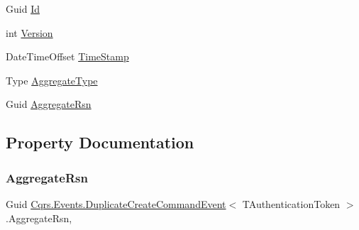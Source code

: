 \begin{DoxyCompactItemize}
\item 
Guid \hyperlink{classCqrs_1_1Events_1_1DuplicateCreateCommandEvent_a6b837c04369ac127fc34f84799c3d70a_a6b837c04369ac127fc34f84799c3d70a}{Id}
\item 
int \hyperlink{classCqrs_1_1Events_1_1DuplicateCreateCommandEvent_ad2d19f109697e676edf4ad7dc7b19bdd_ad2d19f109697e676edf4ad7dc7b19bdd}{Version}
\item 
Date\+Time\+Offset \hyperlink{classCqrs_1_1Events_1_1DuplicateCreateCommandEvent_ae732d7442d4eed8329e39a500433c96c_ae732d7442d4eed8329e39a500433c96c}{Time\+Stamp}
\item 
Type \hyperlink{classCqrs_1_1Events_1_1DuplicateCreateCommandEvent_ab08eddd7b1f812bdd62103017fd64f7e_ab08eddd7b1f812bdd62103017fd64f7e}{Aggregate\+Type}
\item 
Guid \hyperlink{classCqrs_1_1Events_1_1DuplicateCreateCommandEvent_a06ead08bb17fa98576201f301971fad2_a06ead08bb17fa98576201f301971fad2}{Aggregate\+Rsn}
\end{DoxyCompactItemize}


\subsection{Property Documentation}
\mbox{\label{classCqrs_1_1Events_1_1DuplicateCreateCommandEvent_a06ead08bb17fa98576201f301971fad2_a06ead08bb17fa98576201f301971fad2}} 
\subsubsection{\texorpdfstring{Aggregate\+Rsn}{AggregateRsn}}
{\footnotesize\ttfamily Guid \hyperlink{classCqrs_1_1Events_1_1DuplicateCreateCommandEvent}{Cqrs.\+Events.\+Duplicate\+Create\+Command\+Event}$<$ T\+Authentication\+Token $>$.Aggregate\+Rsn\hspace{0.3cm}{\ttfamily [get]}, {\ttfamily [set]}}

